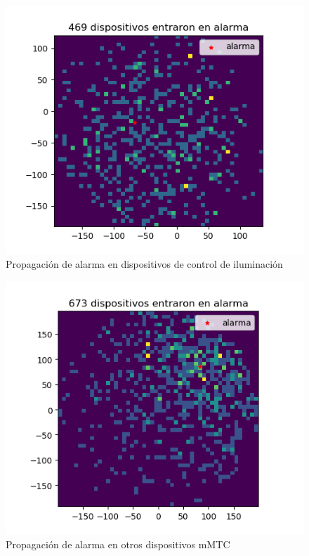 \begin{figure}[th]
    \centering
    \includegraphics[scale=.7]{Figures/UEs_de_tipo_Control_de_iluminacion_activados_por_una_alarma.png}
    \decoRule
    \caption[Propagación de alarma en dispositivos de control de iluminación]{Propagación de alarma en dispositivos de control de iluminación}
    \label{fig:propagacion1}
\end{figure}

\begin{figure}[th]
    \centering
    \includegraphics[scale=.7]{Figures/UEs_de_tipo_Otros_dispositivos_mMTC_activados_por_una_alarma.png}
    \decoRule
    \caption[Propagación de alarma en otros dispositivos mMTC]{Propagación de alarma en otros dispositivos mMTC}
    \label{fig:propagacion2}
\end{figure}

